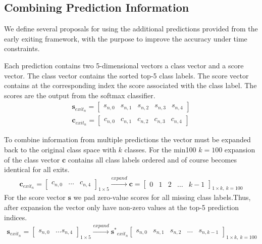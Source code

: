 \subsection{Combining Prediction Information}

We define several proposals for using the additional predictions provided from the early exiting framework, with the purpose to improve the accuracy under time constraints. 

Each prediction contains two 5-dimensional vectors a class vector and a score vector. The class vector contains the sorted top-5 class labels. The score vector contains at the corresponding index the score associated with the class label. The scores are the output from the softmax classifier.
\begin{align*}
\mathbf{s}_{exit_n} = \begin{bmatrix}
s_{n,0} & s_{n,1} & s_{n,2} & s_{n,3} & s_{n,4}
\end{bmatrix} \\
\mathbf{c}_{exit_n} = \begin{bmatrix}
c_{n,0} & c_{n,1} & c_{n,2} & c_{n,3} & c_{n,4}
\end{bmatrix}
\end{align*}

To combine information from multiple predictions the vector must be expanded back to the original class space with $k$ classes. For the \gls{min100} $k=100$ expansion of the class vector $\mathbf{c}$ contains all class labels ordered and of course becomes identical for all exits.
\begin{align*}
\mathbf{c}_{exit_n}= 
\begin{bmatrix}
c_{n,0} & \dots & c_{n,4}
\end{bmatrix}_{1 \times 5}
\xrightarrow{expand} 
\mathbf{c} =
\begin{bmatrix}
0 & 1 & 2 & \dots & k-1
\end{bmatrix}_{1 \times k,\: k=100} 
\end{align*} 
For the score vector $\mathbf{s}$ we pad zero-value scores for all missing class labels.Thus, after expansion the vector only have non-zero values at the top-5 prediction indices.
\begin{align*}
\mathbf{s}_{exit_n} = 
\begin{bmatrix}
s_{n,0} & \dots s_{n,4}
\end{bmatrix}_{1 \times 5} 
\xrightarrow{expand}
\mathbf{s^*}_{exit_n}
\begin{bmatrix}
s_{n,0} & s_{n,1} & s_{n,2} &\dots & s_{n,k-1}
\end{bmatrix}_{1 \times k,\: k=100} 
\end{align*}
